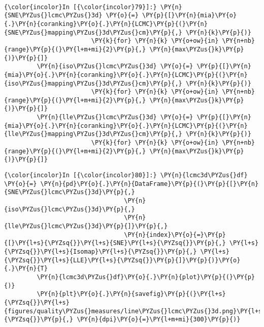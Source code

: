     \begin{center}
    \end{center}
    { \hspace*{\fill} \\}

    \begin{Verbatim}[commandchars=\\\{\}]
{\color{incolor}In [{\color{incolor}79}]:} \PY{n}{SNE\PYZus{}lcmc\PYZus{}3d} \PY{o}{=} \PY{p}{[}\PY{n}{mia}\PY{o}{.}\PY{n}{coranking}\PY{o}{.}\PY{n}{LCMC}\PY{p}{(}\PY{n}{SNE\PYZus{}mapping\PYZus{}3d\PYZus{}cm}\PY{p}{,} \PY{n}{k}\PY{p}{)}
                        \PY{k}{for} \PY{n}{k} \PY{o+ow}{in} \PY{n+nb}{range}\PY{p}{(}\PY{l+m+mi}{2}\PY{p}{,} \PY{n}{max\PYZus{}k}\PY{p}{)}\PY{p}{]}
         \PY{n}{iso\PYZus{}lcmc\PYZus{}3d} \PY{o}{=} \PY{p}{[}\PY{n}{mia}\PY{o}{.}\PY{n}{coranking}\PY{o}{.}\PY{n}{LCMC}\PY{p}{(}\PY{n}{iso\PYZus{}mapping\PYZus{}3d\PYZus{}cm}\PY{p}{,} \PY{n}{k}\PY{p}{)}
                        \PY{k}{for} \PY{n}{k} \PY{o+ow}{in} \PY{n+nb}{range}\PY{p}{(}\PY{l+m+mi}{2}\PY{p}{,} \PY{n}{max\PYZus{}k}\PY{p}{)}\PY{p}{]}
         \PY{n}{lle\PYZus{}lcmc\PYZus{}3d} \PY{o}{=} \PY{p}{[}\PY{n}{mia}\PY{o}{.}\PY{n}{coranking}\PY{o}{.}\PY{n}{LCMC}\PY{p}{(}\PY{n}{lle\PYZus{}mapping\PYZus{}3d\PYZus{}cm}\PY{p}{,} \PY{n}{k}\PY{p}{)}
                        \PY{k}{for} \PY{n}{k} \PY{o+ow}{in} \PY{n+nb}{range}\PY{p}{(}\PY{l+m+mi}{2}\PY{p}{,} \PY{n}{max\PYZus{}k}\PY{p}{)}\PY{p}{]}
\end{Verbatim}

    \begin{Verbatim}[commandchars=\\\{\}]
{\color{incolor}In [{\color{incolor}80}]:} \PY{n}{lcmc3d\PYZus{}df} \PY{o}{=} \PY{n}{pd}\PY{o}{.}\PY{n}{DataFrame}\PY{p}{(}\PY{p}{[}\PY{n}{SNE\PYZus{}lcmc\PYZus{}3d}\PY{p}{,}
                                 \PY{n}{iso\PYZus{}lcmc\PYZus{}3d}\PY{p}{,}
                                 \PY{n}{lle\PYZus{}lcmc\PYZus{}3d}\PY{p}{]}\PY{p}{,}
                                 \PY{n}{index}\PY{o}{=}\PY{p}{[}\PY{l+s}{\PYZsq{}}\PY{l+s}{SNE}\PY{l+s}{\PYZsq{}}\PY{p}{,} \PY{l+s}{\PYZsq{}}\PY{l+s}{Isomap}\PY{l+s}{\PYZsq{}}\PY{p}{,} \PY{l+s}{\PYZsq{}}\PY{l+s}{LLE}\PY{l+s}{\PYZsq{}}\PY{p}{]}\PY{p}{)}\PY{o}{.}\PY{n}{T}
         \PY{n}{lcmc3d\PYZus{}df}\PY{o}{.}\PY{n}{plot}\PY{p}{(}\PY{p}{)}
         \PY{n}{plt}\PY{o}{.}\PY{n}{savefig}\PY{p}{(}\PY{l+s}{\PYZsq{}}\PY{l+s}{figures/quality\PYZus{}measures/line\PYZus{}lcmc\PYZus{}3d.png}\PY{l+s}{\PYZsq{}}\PY{p}{,} \PY{n}{dpi}\PY{o}{=}\PY{l+m+mi}{300}\PY{p}{)}
\end{Verbatim}

